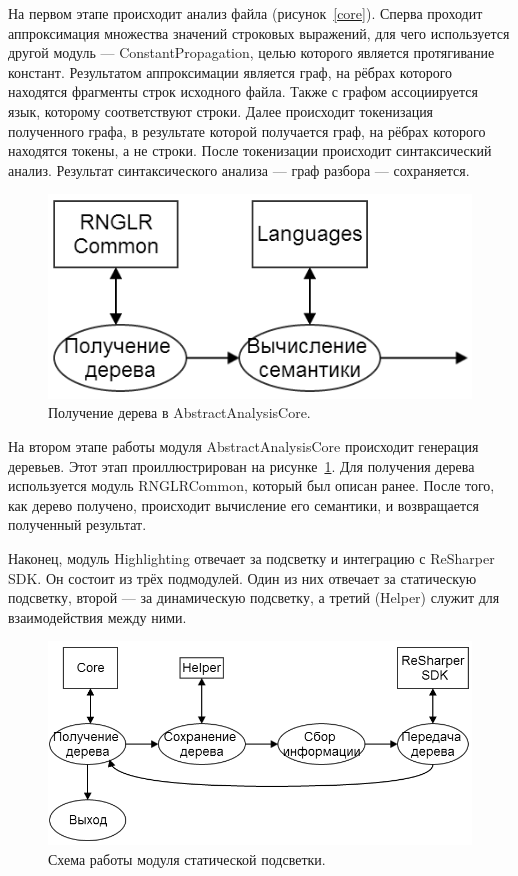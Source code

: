 На первом этапе происходит анализ файла (рисунок~\ref{core}). Сперва проходит аппроксимация множества значений строковых выражений, для чего используется другой модуль --- ConstantPropagation, целью которого является протягивание констант. Результатом аппроксимации является граф, на рёбрах которого находятся фрагменты строк исходного файла. Также с графом ассоциируется язык, которому соответствуют строки. Далее происходит токенизация полученного графа, в результате которой получается граф, на рёбрах которого находятся токены, а не строки. После токенизации происходит синтаксический анализ. Результат синтаксического анализа --- граф разбора --- сохраняется. 

\begin{figure}[t]
\centering
\includegraphics[width=\linewidth]{Ivanov/Pictures/Core_GetTree.png}
\caption{Получение дерева в AbstractAnalysisCore.}
\label{core_tree}
\end{figure}

На втором этапе работы модуля AbstractAnalysisCore происходит генерация деревьев. Этот этап проиллюстрирован на рисунке~\ref{core_tree}. Для получения дерева используется модуль RNGLRCommon, который был описан ранее. После того, как дерево получено, происходит вычисление его семантики, и возвращается полученный результат. 

Наконец, модуль Highlighting отвечает за подсветку и интеграцию с ReSharper SDK. Он состоит из трёх подмодулей. Один из них отвечает за статическую подсветку, второй --- за динамическую подсветку, а третий (Helper) служит для взаимодействия между ними. 

\begin{figure}[t]
\centering
\includegraphics[width=\linewidth]{Ivanov/Pictures/staticHighlighting.png}
\caption{Схема работы модуля статической подсветки.}
\label{staticHighlighting}
\end{figure}

